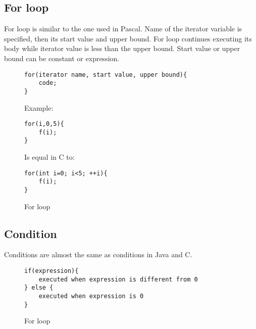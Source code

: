\documentclass{article}
\begin{document}
\subsection{For loop}
For loop is similar to the one used in Pascal. Name
of the iterator variable is specified, then its start value
and upper bound. For loop continues executing its body while 
iterator value is less than the upper bound. Start value or upper bound
can be constant or expression.
\begin{figure}[H]
	\begin{lstlisting}
for(iterator name, start value, upper bound){
	code;
}
	\end{lstlisting}
Example:
	\begin{lstlisting}
for(i,0,5){
	f(i);
}
	\end{lstlisting}
Is equal in C to:
	\begin{lstlisting}
for(int i=0; i<5; ++i){
	f(i);
}
	\end{lstlisting}
	\caption{For loop \label{fig:syntax_for}}
\end{figure}
\subsection{Condition}
Conditions are almost the same as conditions in Java and C.
\begin{figure}[H]
	\begin{lstlisting}
if(expression){
	executed when expression is different from 0
} else {
	executed when expression is 0
}
	\end{lstlisting}
	\caption{For loop \label{fig:syntax_if}}
\end{figure}
\end{document}
